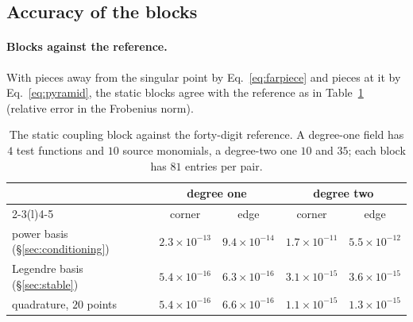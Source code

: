 \documentclass[11pt,a4paper]{article}
\begin{document}
\subsection{Accuracy of the blocks}\label{sec:accuracy}

\paragraph{Blocks against the reference.} With pieces away from the singular point by
Eq.~\eqref{eq:farpiece} and pieces at it by Eq.~\eqref{eq:pyramid}, the static blocks agree with the
reference as in Table~\ref{tab:accuracy} (relative error in the Frobenius norm).

\begin{table}[h]
\centering
\small
\begin{tabular}{lcccc}
\toprule
 & \multicolumn{2}{c}{degree one} & \multicolumn{2}{c}{degree two} \\
\cmidrule(lr){2-3}\cmidrule(l){4-5}
 & corner & edge & corner & edge \\
\midrule
power basis (\S\ref{sec:conditioning}) & $2.3\times10^{-13}$ & $9.4\times10^{-14}$ & $1.7\times10^{-11}$ & $5.5\times10^{-12}$\\
Legendre basis (\S\ref{sec:stable}) & $5.4\times10^{-16}$ & $6.3\times10^{-16}$ & $3.1\times10^{-15}$ & $3.6\times10^{-15}$\\
quadrature, $20$ points & $5.4\times10^{-16}$ & $6.6\times10^{-16}$ & $1.1\times10^{-15}$ & $1.3\times10^{-15}$\\
\bottomrule
\end{tabular}
\caption{The static coupling block against the forty-digit reference. A degree-one field has $4$ test
functions and $10$ source monomials, a degree-two one $10$ and $35$; each block has $81$ entries per pair.}
\label{tab:accuracy}
\end{table}
\end{document}
